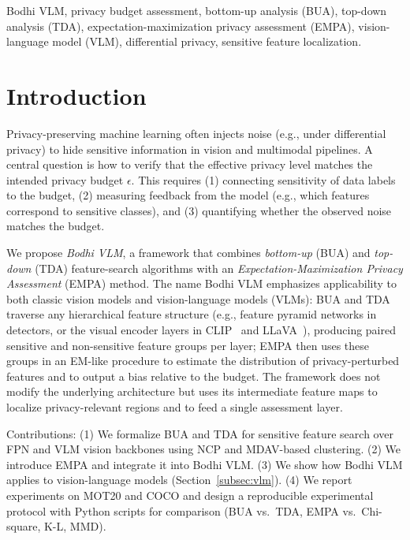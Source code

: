 \documentclass[journal]{IEEEtran}
\begin{document}
\begin{IEEEkeywords}
Bodhi VLM, privacy budget assessment, bottom-up analysis (BUA), top-down analysis (TDA), expectation-maximization privacy assessment (EMPA), vision-language model (VLM), differential privacy, sensitive feature localization.
\end{IEEEkeywords}

\section{Introduction}
\label{sec:intro}

Privacy-preserving machine learning often injects noise (e.g., under differential privacy) to hide sensitive information in vision and multimodal pipelines. A central question is how to verify that the effective privacy level matches the intended privacy budget $\epsilon$. This requires (1) connecting sensitivity of data labels to the budget, (2) measuring feedback from the model (e.g., which features correspond to sensitive classes), and (3) quantifying whether the observed noise matches the budget.

We propose \emph{Bodhi VLM}, a framework that combines \emph{bottom-up} (BUA) and \emph{top-down} (TDA) feature-search algorithms with an \emph{Expectation-Maximization Privacy Assessment} (EMPA) method. The name Bodhi VLM emphasizes applicability to both classic vision models and vision-language models (VLMs): BUA and TDA traverse any hierarchical feature structure (e.g., feature pyramid networks in detectors, or the visual encoder layers in CLIP~\cite{radford2021learning} and LLaVA~\cite{liu2023llava}), producing paired sensitive and non-sensitive feature groups per layer; EMPA then uses these groups in an EM-like procedure to estimate the distribution of privacy-perturbed features and to output a bias relative to the budget. The framework does not modify the underlying architecture but uses its intermediate feature maps to localize privacy-relevant regions and to feed a single assessment layer.

Contributions: (1) We formalize BUA and TDA for sensitive feature search over FPN and VLM vision backbones using NCP and MDAV-based clustering. (2) We introduce EMPA and integrate it into Bodhi VLM. (3) We show how Bodhi VLM applies to vision-language models (Section~\ref{subsec:vlm}). (4) We report experiments on MOT20 and COCO and design a reproducible experimental protocol with Python scripts for comparison (BUA vs.\ TDA, EMPA vs.\ Chi-square, K-L, MMD).
\end{document}
